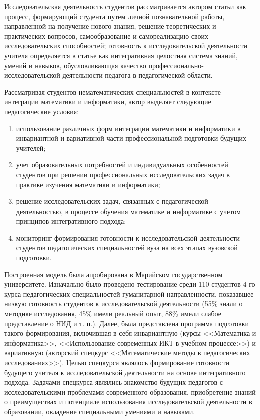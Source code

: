 \documentclass[oneside]{scrartcl}
\begin{document}
Исследовательская деятельность студентов рассматривается автором статьи как процесс, формирующий студента путем личной
познавательной работы, направленной на получение нового знания, решение теоретических и практических вопросов, самообразование
и самореализацию своих исследовательских способностей; готовность к исследовательской деятельности учителя определяется в статье
как интегративная целостная система знаний, умений и навыков, обусловливающая качество профессионально-исследовательской
деятельности педагога в педагогической области.

Рассматривая студентов нематематических специальностей в контексте интеграции математики и информатики, автор выделяет следующие
педагогические условия:
\begin{enumerate}[1)]
\item использование различных форм интеграции математики и информатики в инвариантной и вариативной части профессиональной
подготовки будущих учителей;

\item учет образовательных потребностей и индивидуальных особенностей студентов при решении профессиональных исследовательских
задач в практике изучения математики и информатики;

\item решение исследовательских задач, связанных с педагогической деятельностью, в процессе обучения математике и информатике
с учетом принципов интегративного подхода;

\item мониторинг формирования готовности к исследовательской деятельности студентов педагогических специальностей вуза
на всех этапах вузовской подготовки. 
\end{enumerate}

Построенная модель была апробирована в Марийском государственном университете. Изначально было проведено тестирование среди 110
студентов 4-го курса педагогических специальностей гуманитарной направленности, показавшее низкую готовность студентов 
к исследовательской деятельности (55\% знали о методике исследования, 45\% имели реальный опыт, 88\% имели слабое
представление о НИД и т. п.).
Далее, была представлена программа подготовки такого формирования, включившая в себя инвариантную (курсы <<Математика и
информатика>>, <<Использование современных ИКТ в учебном процессе>>) и вариативную (авторский спецкурс <<Математические
методы в педагогических исследованиях>>). Целью спецкурса являлось формирование готовности будущего учителя к исследовательской
деятельности на основе интегративного подхода. Задачами спецкурса являлись знакомство будущих педагогов с исследовательскими
проблемами современного образования, приобретение знаний о преимуществах и потенциале использования исследовательской
деятельности в образовании, овладение специальными умениями и навыками.
\end{document}
